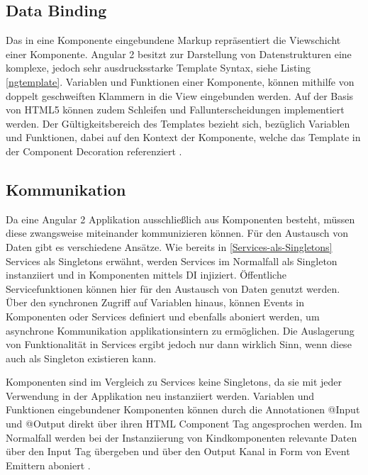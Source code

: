 \subsection{Data Binding}
Das in eine Komponente eingebundene Markup repräsentiert die Viewschicht einer Komponente.
Angular 2 besitzt zur Darstellung von Datenstrukturen eine komplexe, jedoch sehr ausdrucksstarke Template Syntax, siehe Listing \ref{ngtemplate}.
Variablen und Funktionen einer Komponente, können mithilfe von doppelt geschweiften Klammern in die View eingebunden werden.
Auf der Basis von HTML5 können zudem Schleifen und Fallunterscheidungen implementiert werden.
Der Gültigkeitsbereich des Templates bezieht sich, bezüglich Variablen und Funktionen, dabei auf den Kontext der Komponente,
welche das Template in der Component Decoration referenziert \cite{Templ78:online}.

\vspace{0.3cm}


\subsection{Kommunikation}

Da eine Angular 2 Applikation ausschließlich aus Komponenten besteht, müssen diese zwangsweise miteinander
kommunizieren können. Für den Austausch von Daten gibt es verschiedene Ansätze.
Wie bereits in \ref{Services-als-Singletons} Services als Singletons erwähnt, werden Services im Normalfall als Singleton
instanziiert und in Komponenten mittels \ac{DI} injiziert. Öffentliche Servicefunktionen können hier für den
Austausch von Daten genutzt werden. Über den synchronen Zugriff auf Variablen hinaus,
können Events in Komponenten oder Services definiert und ebenfalls aboniert werden,
um asynchrone Kommunikation applikationsintern zu ermöglichen. Die Auslagerung von Funktionalität in Services ergibt jedoch nur dann wirklich Sinn,
wenn diese auch als Singleton existieren kann.

Komponenten sind im Vergleich zu Services keine Singletons,
da sie mit jeder Verwendung in der Applikation neu instanziiert werden.
Variablen und Funktionen eingebundener Komponenten können durch die Annotationen @Input und @Output
direkt über ihren HTML Component Tag angesprochen werden. Im Normalfall werden bei der Instanziierung von Kindkomponenten
relevante Daten über den Input Tag übergeben und über den Output Kanal in Form von Event Emittern aboniert \cite{Angul94:online}.


